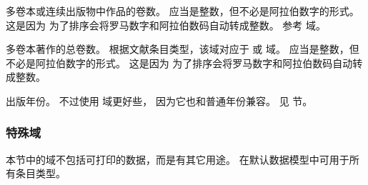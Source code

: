 \begin{fieldlist}


多卷本或连续出版物中作品的卷数。
应当是整数，但不必是阿拉伯数字的形式。
这是因为 \biber 为了排序会将罗马数字和阿拉伯数码自动转成整数。
参考  域。




多卷本著作的总卷数。
根据文献条目类型，该域对应于  或  域。
应当是整数，但不必是阿拉伯数字的形式。
这是因为 \biber 为了排序会将罗马数字和阿拉伯数码自动转成整数。




出版年份。
不过使用  域更好些，
因为它也和普通年份兼容。
见  节。

\end{fieldlist}

\subsubsection{特殊域}%
\label{bib:fld:spc}


本节中的域不包括可打印的数据，而是有其它用途。
在默认数据模型中可用于所有条目类型。

